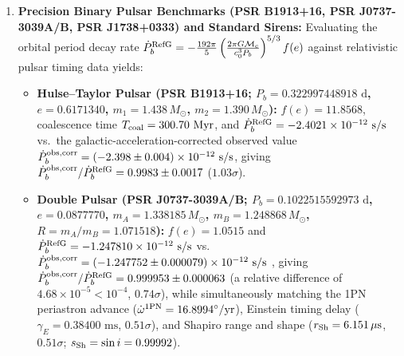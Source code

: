 \documentclass[11pt,a4paper]{article}
\begin{document}
\begin{enumerate}[label=\arabic*.]
\begin{align}
P_{\rm GW} &= \frac{G}{5c_0^5}\left\langle\dddot{Q}_{ij}\dddot{Q}^{ij}\right\rangle = \frac{32 G^4 m_1^2 m_2^2(m_1+m_2)}{5 c_0^5 a^5}\,f(e), \nonumber\\
\left\langle\frac{dJ}{dt}\right\rangle &= -\frac{32 G^{7/2} m_1^2 m_2^2\sqrt{m_1+m_2}}{5 c_0^5 a^{7/2}}\,g(e),
\end{align}
with exact symbolic Peters--Mathews eccentric enhancement factors
\begin{equation}
f(e) = \frac{1 + \frac{73}{24}e^2 + \frac{37}{96}e^4}{(1-e^2)^{7/2}}, \qquad g(e) = \frac{1 + \frac{7}{8}e^2}{(1-e^2)^2}.
\end{equation}
Dividing $da/dt$ by $de/dt$ integrates in closed form to Peters' invariant $a(e) = c_0 e^{12/19}(1-e^2)\left[1 + \frac{121}{304}e^2\right]^{870/2299}$. Furthermore, because the two-charge inertia theorem ensures universal coupling ($M_I = M_{\rm ADM}$) with zero scalar sensitivity difference ($\Delta s_{12} = s_1 - s_2 \equiv 0$), dipolar gravitational radiation vanishes identically ($\dot{P}_b^{\rm dipole} \equiv 0$) for both neutron-star--neutron-star and neutron-star--white-dwarf binaries.
\item \textbf{Precision Binary Pulsar Benchmarks (PSR B1913+16, PSR J0737-3039A/B, PSR J1738+0333) and Standard Sirens:} Evaluating the orbital period decay rate $\dot{P}_b^{\rm RefG} = -\frac{192\pi}{5}\left(\frac{2\pi G\mathcal{M}_c}{c_0^3 P_b}\right)^{5/3}f(e)$ against relativistic pulsar timing data yields:
\begin{itemize}
\item \textbf{Hulse--Taylor Pulsar (PSR B1913+16; $P_b = 0.322997448918\text{ d}$, $e = 0.6171340$, $m_1 = 1.438\,M_\odot$, $m_2 = 1.390\,M_\odot$):} $f(e) = 11.8568$, coalescence time $T_{\rm coal} = 300.70\text{ Myr}$, and $\dot{P}_b^{\rm RefG} = -2.4021\times 10^{-12}\text{ s/s}$ vs.\ the galactic-acceleration-corrected observed value $\dot{P}_b^{\rm obs,corr} = (-2.398 \pm 0.004)\times 10^{-12}\text{ s/s}$, giving $\dot{P}_b^{\rm obs,corr}/\dot{P}_b^{\rm RefG} = 0.9983 \pm 0.0017$ ($1.03\sigma$).
\item \textbf{Double Pulsar (PSR J0737-3039A/B; $P_b = 0.1022515592973\text{ d}$, $e = 0.0877770$, $m_A = 1.338185\,M_\odot$, $m_B = 1.248868\,M_\odot$, $R = m_A/m_B = 1.071518$):} $f(e) = 1.0515$ and $\dot{P}_b^{\rm RefG} = -1.247810\times 10^{-12}\text{ s/s}$ vs.\ $\dot{P}_b^{\rm obs,corr} = (-1.247752 \pm 0.000079)\times 10^{-12}\text{ s/s}$ \citep{kramer2021}, giving $\dot{P}_b^{\rm obs,corr}/\dot{P}_b^{\rm RefG} = 0.999953 \pm 0.000063$ (a relative difference of $4.68\times 10^{-5} < 10^{-4}$, $0.74\sigma$), while simultaneously matching the 1PN periastron advance ($\dot{\omega}^{\rm 1PN} = 16.8994^\circ/\text{yr}$), Einstein timing delay ($\gamma_E = 0.38400\text{ ms}$, $0.51\sigma$), and Shapiro range and shape ($r_{\rm Sh} = 6.151\,\mu\text{s}$, $0.51\sigma$; $s_{\rm Sh} = \sin i = 0.99992$).

\end{itemize}
\end{enumerate}
\end{document}
